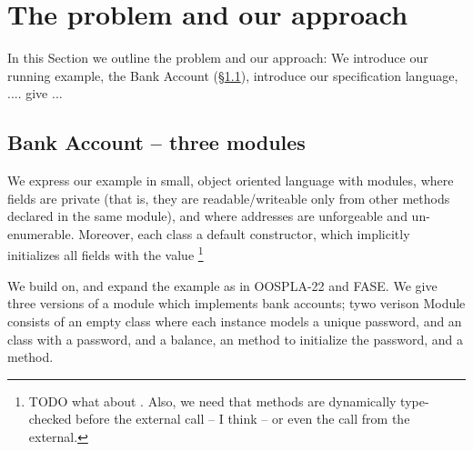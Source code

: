 

\section{The problem and our approach}
\label{s:outline}
 
In this Section we outline the problem and our approach:  
We  introduce  our running example, the Bank Account (\S\ref{s:bank}),  
introduce our specification language, ....  give ...
 

 \subsection{Bank Account -- three modules}
\label{s:bank}

We express  our example in  small, object oriented language with modules, where fields are private 
(that is, they are readable/writeable only from other methods declared in the same module), and where addresses are 
unforgeable and un-enumerable.
Moreover, each class a default constructor, which implicitly initializes all fields with the  value \footnote{TODO what about . 
Also, we need that methods are dynamically type-checked before the external call -- I think -- or even the call from the external. }
  
\vspace{.1cm}

We build on, and expand the  example as in OOSPLA-22 and FASE. We give three versions of a module which implements bank accounts; tywo verison Module \ModA consists of an empty 
 class where each instance models a unique password, and an  class with a password, and a balance, an  method to 
initialize the password, and 
a
 method. 
%
%
%
%
% 


